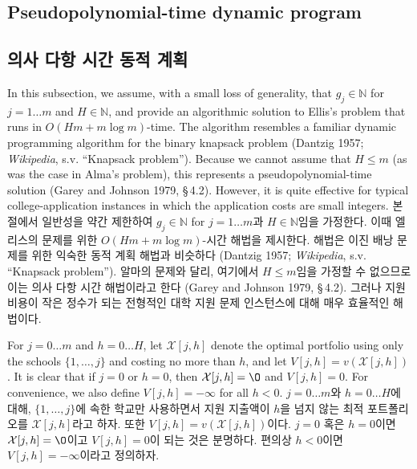 \documentclass[11pt]{article} %
\theoremstyle{definition}
\theoremstyle{definition}
\begin{document}
\ifen \subsection{Pseudopolynomial-time dynamic program} \else\subsection{의사 다항 시간 동적 계획} \fi
\ifen
In this subsection, we assume, with a small loss of generality, that $g_j \in \mathbb{N}$ for $j = 1\dots m$ and $H \in\mathbb{N}$, and provide an algorithmic solution to Ellis's problem that runs in $O(Hm + m\log m)$-time. The algorithm resembles a familiar dynamic programming algorithm for the binary knapsack problem (Dantzig 1957; \emph{Wikipedia}, s.v. ``Knapsack problem''). Because we cannot assume that $H \leq m$ (as was the case in Alma's problem), this represents a pseudopolynomial-time solution (Garey and Johnson 1979, \S\,4.2). However, it is quite effective for typical college-application instances in which the application costs are small integers.
\else
본 절에서 일반성을 약간 제한하여 $g_j \in \mathbb{N}$ for $j = 1\dots m$과 $H \in\mathbb{N}$임을 가정한다. 이때 엘리스의 문제를 위한 $O(Hm + m\log m)$-시간 해법을 제시한다. 해법은 이진 배낭 문제를 위한 익숙한 동적 계획 해법과 비슷하다 (Dantzig 1957; \emph{Wikipedia}, s.v. ``Knapsack problem''). 알마의 문제와 달리, 여기에서 $H \leq m$임을 가정할 수 없으므로 이는 의사 다항 시간 해법이라고 한다 (Garey and Johnson 1979, \S\,4.2). 그러나 지원 비용이 작은 정수가 되는 전형적인 대학 지원 문제 인스턴스에 대해 매우 효율적인 해법이다.
\fi

\ifen 
For $j = 0 \dots m$ and $h = 0 \dots H$, let $\mathcal{X}[j, h]$ denote the optimal portfolio using only the schools $\{ 1, \dots, j\}$ and costing no more than $h$, and let $V[j,h] = v(\mathcal{X}[j, h])$.  It is clear that if $j=0$ or $h=0$, then $\mathcal{X}[j, h] = \O$ and $V[j, h] = 0$.  For convenience, we also define $V[j, h] = -\infty$ for all $h < 0$.
\else
$j = 0 \dots m$와 $h = 0 \dots H$에 대해, $\{ 1, \dots, j\}$에 속한 학교만 사용하면서 지원 지출액이 $h$을 넘지 않는 최적 포트폴리오를 $\mathcal{X}[j, h]$라고 하자. 또한  $V[j,h] = v(\mathcal{X}[j, h])$이다. $j=0$ 혹은 $h=0$이면 $\mathcal{X}[j, h] = \O$이고 $V[j, h] = 0$이 되는 것은 분명하다. 편의상 $h < 0$이면 $V[j, h] = -\infty$이라고 정의하자.
\fi
\end{document}
